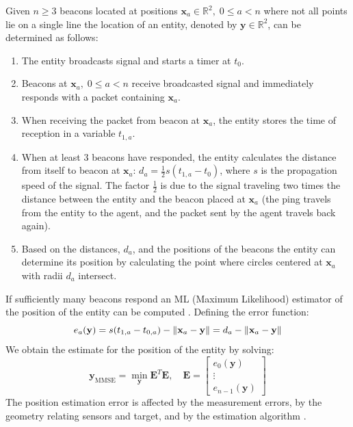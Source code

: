 Given $n\geq 3$ beacons located at positions $\mathbf{x}_{a}\in\mathbb{R}^{2},\; 0\leq a<n$ where not all points
lie on a single line the location 
of an entity, denoted by $\mathbf{y}\in\mathbb{R}^{2}$, can be determined as follows:
\begin{enumerate}
  \item The entity broadcasts signal and starts a timer at $t_{0}$.
  \item Beacons at $\mathbf{x}_{a},\; 0\leq a<n$ receive broadcasted signal and immediately responds with a packet containing $\mathbf{x}_{a}$.
  \item When receiving the packet from beacon at $\mathbf{x}_{a}$, the entity stores the time of reception in a variable $t_{1, a}$.
  \item When at least 3 beacons have responded, the entity calculates the distance
  from itself to beacon at $\mathbf{x}_{a}$: $d_{a} = \frac{1}{2}s(t_{1, a} - t_{0})$, where $s$ is the propagation speed of the signal. The factor $\frac{1}{2}$ is due to the signal traveling
  two times the distance between the entity and the beacon placed at $\mathbf{x}_{a}$ (the ping travels from the entity to the agent, and the packet
  sent by the agent travels back again).
  \item Based on the distances, $d_{a}$, and the positions of the beacons the entity can
  determine its position by calculating the point where circles centered at $\mathbf{x}_{a}$ with radii $d_{a}$ intersect.
\end{enumerate}
If sufficiently many beacons respond an ML (Maximum Likelihood) estimator of the position of the entity can be computed \cite{10.1145/381677.381693}.
Defining the error function:\begin{equation}
  e_{a}(\mathbf{y}) = s(t_{1, a} - t_{0, a}) - \left\lVert\mathbf{x}_{a} - \mathbf{y}\right\rVert = d_{a} - \left\lVert\mathbf{x}_{a} - \mathbf{y}\right\rVert
\end{equation}
We obtain the estimate for the position of the entity by solving:
\begin{equation}
  \mathbf{y}_{\mathrm{MMSE}} = \min_{\mathbf{y}} \mathbf{E}^{T}\mathbf{E},\quad\mathbf{E} = \begin{bmatrix}
    e_{0}(\mathbf{y})\\
    \vdots\\
    e_{n-1}(\mathbf{y})
  \end{bmatrix}
\end{equation}
The position estimation error is affected by the measurement errors, by the geometry relating sensors and target, and by the estimation algorithm \cite{trilat_error}.
